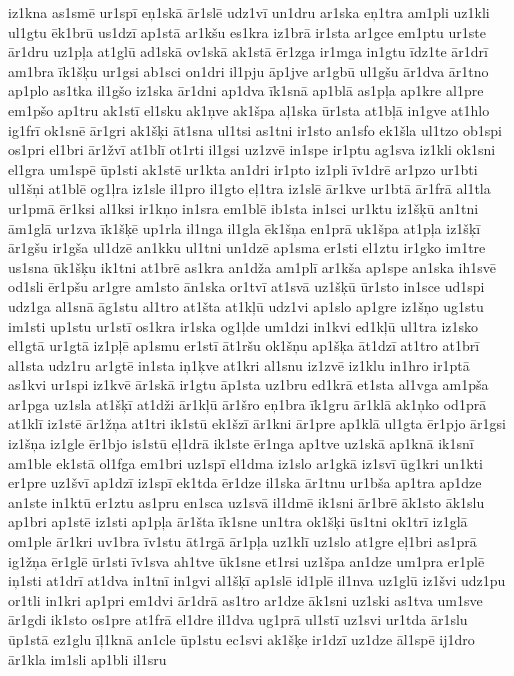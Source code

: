 {iz1kna
as1smē
ur1spī
eņ1skā
ār1slē
udz1vī
un1dru
ar1ska
eņ1tra
am1pli
uz1kli
ul1gtu
ēk1brū
us1dzī
ap1stā
ar1kšu
es1kra
iz1brā
ir1sta
ar1gce
em1ptu
ur1ste
ār1dru
uz1pļa
at1glū
ad1skā
ov1skā
ak1stā
ēr1zga
ir1mga
in1gtu
īdz1te
ār1drī
am1bra
īk1šķu
ur1gsi
ab1sci
on1dri
il1pju
āp1jve
ar1gbū
ul1gšu
ār1dva
ār1tno
ap1plo
as1tka
il1gšo
iz1ska
ār1dni
ap1dva
īk1snā
ap1blā
as1pļa
ap1kre
al1pre
em1pšo
ap1tru
ak1stī
el1sku
ak1ņve
ak1špa
aļ1ska
ūr1sta
at1bļā
in1gve
at1hlo
ig1frī
ok1snē
ār1gri
ak1šķi
āt1sna
ul1tsi
as1tni
ir1sto
an1sfo
ek1šla
ul1tzo
ob1spi
os1pri
el1bri
ār1žvī
at1blī
ot1rti
il1gsi
uz1zvē
in1spe
ir1ptu
ag1sva
iz1kli
ok1sni
el1gra
um1spē
ūp1sti
ak1stē
ur1kta
an1dri
ir1pto
iz1pli
īv1drē
ar1pzo
ur1bti
ul1šņi
at1blē
og1ļra
iz1sle
il1pro
il1gto
eļ1tra
iz1slē
ār1kve
ur1btā
ār1frā
al1tla
ur1pmā
ēr1ksi
al1ksi
ir1kņo
in1sra
em1blē
ib1sta
in1sci
ur1ktu
iz1šķū
an1tni
ām1glā
ur1zva
īk1šķē
up1rla
il1nga
il1gla
ēk1šņa
en1prā
uk1špa
at1pļa
iz1šķī
ār1gšu
ir1gša
ul1dzē
an1kku
ul1tni
un1dzē
ap1sma
er1sti
el1ztu
ir1gko
im1tre
us1sna
ūk1šķu
ik1tni
at1brē
as1kra
an1dža
am1plī
ar1kša
ap1spe
an1ska
ih1svē
od1sli
ēr1pšu
ar1gre
am1sto
ān1ska
or1tvī
at1svā
uz1šķū
ūr1sto
in1sce
ud1spi
udz1ga
al1snā
āg1stu
al1tro
at1šta
at1kļū
udz1vi
ap1slo
ap1gre
iz1šņo
ug1stu
im1sti
up1stu
ur1stī
os1kra
ir1ska
og1ļde
um1dzi
in1kvi
ed1kļū
ul1tra
iz1sko
el1gtā
ur1gtā
iz1pļē
ap1smu
er1stī
āt1ršu
ok1šņu
ap1šķa
āt1dzī
at1tro
at1brī
al1sta
udz1ru
ar1gtē
in1sta
iņ1ķve
at1kri
al1snu
iz1zvē
iz1klu
in1hro
ir1ptā
as1kvi
ur1spi
iz1kvē
ār1skā
ir1gtu
āp1sta
uz1bru
ed1krā
et1sta
al1vga
am1pša
ar1pga
uz1sla
at1šķī
at1dži
ār1kļū
ār1šro
eņ1bra
īk1gru
ār1klā
ak1ņko
od1prā
at1klī
iz1stē
ār1žņa
at1tri
ik1stū
ek1šzī
ār1kni
ār1pre
ap1klā
ul1gta
ēr1pjo
ār1gsi
iz1šņa
iz1gle
ēr1bjo
is1stū
eļ1drā
ik1ste
ēr1nga
ap1tve
uz1skā
ap1knā
ik1snī
am1ble
ek1stā
ol1fga
em1bri
uz1spī
el1dma
iz1slo
ar1gkā
iz1svī
ūg1kri
un1kti
er1pre
uz1švī
ap1dzī
iz1spī
ek1tda
ēr1dze
il1ska
ār1tnu
ur1bša
ap1tra
ap1dze
an1ste
in1ktū
er1ztu
as1pru
en1sca
uz1svā
il1dmē
ik1sni
ār1brē
āk1sto
āk1slu
ap1bri
ap1stē
iz1sti
ap1pļa
ār1šta
īk1sne
un1tra
ok1šķi
ūs1tni
ok1trī
iz1glā
om1ple
ār1kri
uv1bra
īv1stu
āt1rgā
ār1pļa
uz1klī
uz1slo
at1gre
eļ1bri
as1prā
ig1žņa
ēr1glē
ūr1sti
īv1sva
ah1tve
ūk1sne
et1rsi
uz1špa
an1dze
um1pra
er1plē
iņ1sti
at1drī
at1dva
in1tnī
in1gvi
al1šķī
ap1slē
id1plē
il1nva
uz1glū
iz1švi
udz1pu
or1tli
in1kri
ap1pri
em1dvi
ār1drā
as1tro
ar1dze
āk1sni
uz1ski
as1tva
um1sve
ār1gdi
ik1sto
os1pre
at1frā
el1dre
il1dva
ug1prā
ul1stī
uz1svi
ur1tda
ār1slu
ūp1stā
ez1glu
īļ1knā
an1cle
ūp1stu
ec1svi
ak1šķe
ir1dzī
uz1dze
āl1spē
ij1dro
ār1kla
im1sli
ap1bli
il1sru
}
